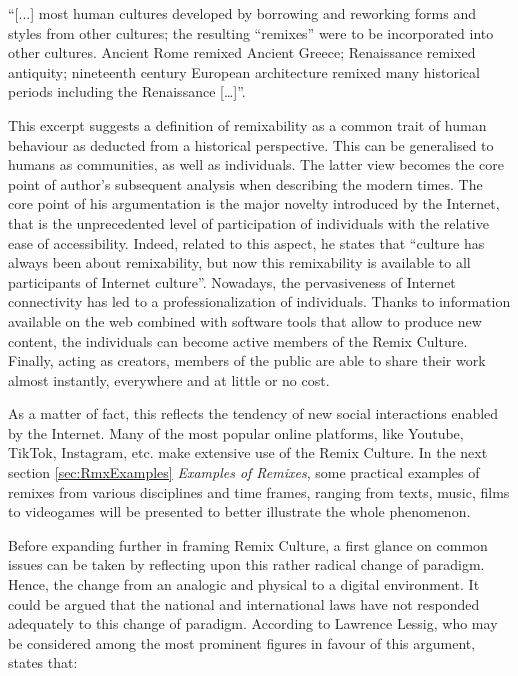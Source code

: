 \begin{displayquote}
    “[...] most human cultures developed by borrowing and reworking forms and styles from other cultures; the resulting “remixes” were to be incorporated into other cultures. Ancient Rome remixed Ancient Greece; Renaissance remixed antiquity; nineteenth century European architecture remixed many historical periods including the Renaissance […]”.
\end{displayquote}

This excerpt suggests a definition of remixability as a common trait of human behaviour as deducted from a historical perspective. This can be generalised to humans as communities, as well as individuals. The latter view becomes the core point of author’s subsequent analysis when describing the modern times. The core point of his argumentation is the major novelty introduced by the Internet, that is the unprecedented level of participation of individuals with the relative ease of accessibility. Indeed, related to this aspect, he states that “culture has always been about remixability, but now this remixability is available to all participants of Internet culture”. Nowadays, the pervasiveness of Internet connectivity has led to a professionalization of individuals. Thanks to information available on the web combined with software tools that allow to produce new content, the individuals can become active members of the Remix Culture. Finally, acting as creators, members of the public are able to share their work almost instantly, everywhere and at little or no cost. 

As a matter of fact, this reflects the tendency of new social interactions enabled by the Internet. Many of the most popular online platforms, like Youtube, TikTok, Instagram, etc. make extensive use of the Remix Culture. In the next section \ref{sec:RmxExamples} \emph{Examples of Remixes}, some practical examples of remixes from various disciplines and time frames, ranging from texts, music, films to videogames will be presented to better illustrate the whole phenomenon.

Before expanding further in framing Remix Culture, a first glance on common issues can be taken by reflecting upon this rather radical change of paradigm. Hence, the change from an analogic and physical to a digital environment. It could be argued that the national and international laws have not responded adequately to this change of paradigm. According to Lawrence Lessig, who may be considered among the most prominent figures in favour of this argument, states that: 


